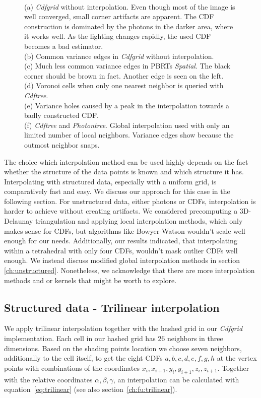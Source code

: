 \begin{figure}
{    \\(a) \textit{Cdfgrid} without interpolation. Even though most of the image is well converged, small corner artifacts are apparent. The CDF construction is dominated by the photons in the darker area, where it works well. As the lighting changes rapidly, the used CDF becomes a bad estimator. 
    \\(b) Common variance edges in \textit{Cdfgrid} without interpolation. 
    \\(c) Much less common variance edges in PBRTs \textit{Spatial}. The black corner should be brown in fact. Another edge is seen on the left. 
    \\(d) Voronoi cells when only one nearest neighbor is queried with \textit{Cdftree}. 
    \\(e) Variance holes caused by a peak in the interpolation towards a badly constructed CDF.
    \\(f) \textit{Cdftree} and \textit{Photontree}. Global interpolation used with only an limited number of local neighbors. Variance edges show because the outmost neighbor snaps.
    }
\end{figure}


The choice which interpolation method can be used highly depends on the fact whether the structure of the data points is known and which structure it has. Interpolating with structured data, especially with a uniform grid, is comparatively fast and easy. We discuss our approach for this case in the following section. For unstructured data, either photons or CDFs, interpolation is harder to achieve without creating artifacts. We considered precomputing a 3D-Delaunay triangulation and applying local interpolation methods, which only makes sense for CDFs, but algorithms like Bowyer-Watson wouldn't scale well enough for our needs. Additionally, our results indicated, that interpolating within a tetrahedral with only four CDFs, wouldn't mask outlier CDFs well enough. We instead discuss modified global interpolation methods in section \ref{ch:unstructured}. Nonetheless, we acknowledge that there are more interpolation methods and or kernels that might be worth to explore.

\subsection{Structured data - Trilinear interpolation}
\label{ch:trilinear}

We apply trilinear interpolation together with the hashed grid in our \textit{Cdfgrid} implementation. Each cell in our hashed grid has 26 neighbors in three dimensions. Based on the shading points location we choose seven neighbors, additionally to the cell itself, to get the eight CDFs $a,b,c,d,e,f,g,h$ at the vertex points with combinations of the coordinates $x_i, x_{i+1}, y_i, y_{i+1}, z_i, z_{i+1}$. Together with the relative coordinates $\alpha, \beta, \gamma$, an interpolation can be calculated with equation~\ref{eq:trilinear} (see also section~\ref{ch:fu:trilinear}).

